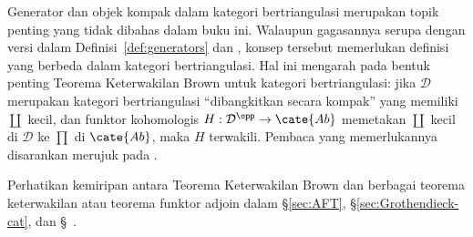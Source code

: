 \begin{catatan}
	Generator dan objek kompak dalam kategori bertriangulasi merupakan topik
	penting yang tidak dibahas dalam buku ini. Walaupun gagasannya serupa dengan
	versi dalam Definisi~\ref{def:generators} dan
	, konsep
	tersebut memerlukan definisi yang berbeda dalam kategori bertriangulasi. Hal
	ini mengarah pada bentuk penting Teorema Keterwakilan Brown untuk kategori
	bertriangulasi: jika $\mathcal{D}$ merupakan kategori bertriangulasi
	``dibangkitkan secara kompak'' yang memiliki $\coprod$ kecil, dan funktor
	kohomologis $H: \mathcal{D}^{\opp} \to \cate{Ab}$ memetakan $\coprod$ kecil
	di $\mathcal{D}$ ke $\prod$ di $\cate{Ab}$, maka $H$ terwakili. Pembaca yang
	memerlukannya disarankan merujuk pada
	\cite[Tags 09SI, 09SM, 0A8E]{stacks}.

	Perhatikan kemiripan antara Teorema Keterwakilan Brown dan berbagai
	teorema keterwakilan atau teorema funktor adjoin dalam \S\ref{sec:AFT},
	\S\ref{sec:Grothendieck-cat}, dan
	\S~.
\end{catatan}
